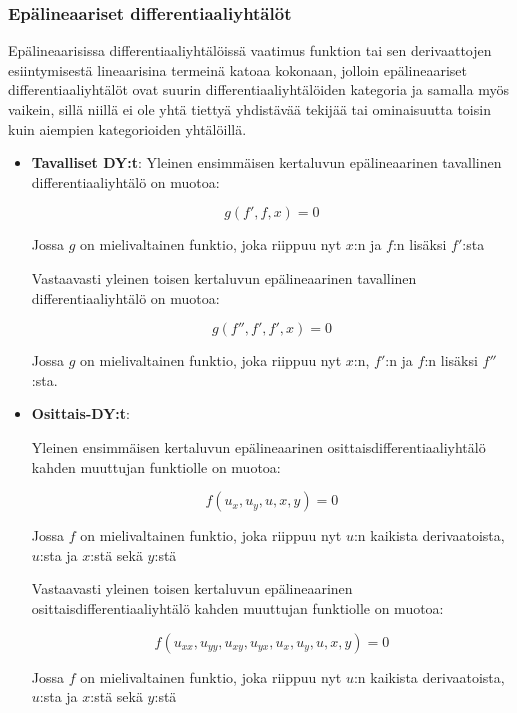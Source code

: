 \documentclass[../johdoksia.tex]{subfiles}
\begin{document}
	\subsubsection{Epälineaariset differentiaaliyhtälöt}
	
	Epälineaarisissa differentiaaliyhtälöissä vaatimus funktion tai sen derivaattojen esiintymisestä lineaarisina termeinä katoaa kokonaan, jolloin epälineaariset differentiaaliyhtälöt ovat suurin differentiaaliyhtälöiden kategoria ja samalla myös vaikein, sillä niillä ei ole yhtä tiettyä yhdistävää tekijää tai ominaisuutta toisin kuin aiempien kategorioiden yhtälöillä.
	
	\begin{itemize}
		\item \textbf{Tavalliset DY:t}:
		Yleinen ensimmäisen kertaluvun epälineaarinen tavallinen differentiaaliyhtälö on muotoa:
		
		\begin{equation}
			g(f', f, x) = 0
		\end{equation}
		
		Jossa $g$ on mielivaltainen funktio, joka riippuu nyt $x$:n ja $f$:n lisäksi $f'$:sta
		
		Vastaavasti yleinen toisen kertaluvun epälineaarinen tavallinen differentiaaliyhtälö on muotoa:
		
		\begin{equation}
			g(f'', f', f', x) = 0
		\end{equation}
		
		Jossa $g$ on mielivaltainen funktio, joka riippuu nyt $x$:n, $f'$:n ja $f$:n lisäksi $f''$:sta.
		
		\item \textbf{Osittais-DY:t}:
		
		Yleinen ensimmäisen kertaluvun epälineaarinen osittaisdifferentiaaliyhtälö kahden muuttujan funktiolle on muotoa:
		
		\begin{equation}
			f(u_x, u_y, u, x, y) = 0
		\end{equation}
		
		Jossa $f$ on mielivaltainen funktio, joka riippuu nyt $u$:n kaikista derivaatoista, $u$:sta ja $x$:stä sekä $y$:stä
		
		Vastaavasti yleinen toisen kertaluvun epälineaarinen osittaisdifferentiaaliyhtälö kahden muuttujan funktiolle on muotoa:
		
		\begin{equation}
			f(u_{xx}, u_{yy}, u_{xy}, u_{yx}, u_{x}, u_{y}, u, x, y) = 0
		\end{equation}
		
		Jossa $f$ on mielivaltainen funktio, joka riippuu nyt $u$:n kaikista derivaatoista, $u$:sta ja $x$:stä sekä $y$:stä
	\end{itemize}
	
\end{document}
